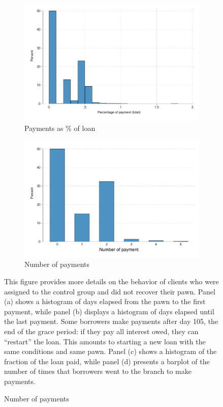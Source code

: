 \begin{figure}[H]
\begin{center}
\begin{subfigure}{0.40\textwidth}
    \end{subfigure}
        \begin{subfigure}{0.40\textwidth}
        \caption{Payments as \% of loan}
        \centering
        \includegraphics[width=\textwidth]{Figuras/hist_percpay_default.pdf}
    \end{subfigure}
    \begin{subfigure}{0.40\textwidth}
        \caption{Number of payments}
        \centering
        \includegraphics[width=\textwidth]{Figuras/hist_numpay_default.pdf}
    \end{subfigure}
    \end{center}
        \scriptsize 
        This figure provides more details on the behavior of clients who were assigned to the control group and did not recover their pawn. Panel (a) shows a histogram of days elapsed from the pawn to the first payment, while panel (b) displays a histogram of days elapsed until the last payment. Some borrowers make payments after day 105, the end of the grace period: if they pay all interest owed, they can ``restart'' the loan. This amounts to starting a new loan with the same conditions and same pawn. Panel (c) shows a histogram of the fraction of the loan paid, while panel (d) presents a barplot of the number of times that borrowers went to the branch to make payments.
\end{figure}



